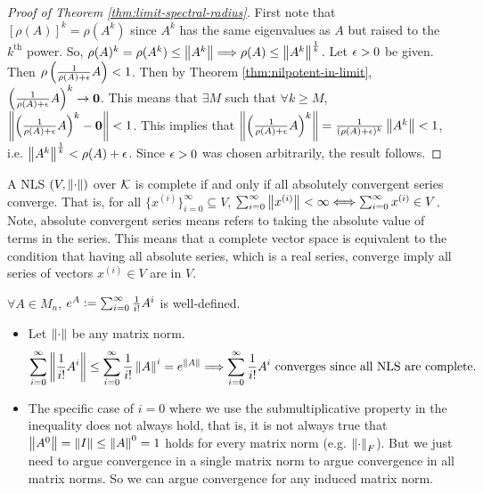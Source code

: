 \begin{proof}[Proof of Theorem \ref{thm:limit-spectral-radius}]
First note that $[\rho(A)]^k = \rho(A^k)$ since $A^k$ has the same eigenvalues as $A$ but raised to the $k^{\text{th}}$ power. So, $\rho(A)^k = \rho(A^k) \le \left\lVert A^k\right\rVert \Longrightarrow \rho(A)\le\left\lVert A^k\right\rVert^{\frac{1}{k}}$. Let $\epsilon>0$ be given. Then $\rho\left(\frac{1}{\rho(A)+\epsilon}A\right) < 1$. Then by Theorem \ref{thm:nilpotent-in-limit}, $\left(\frac{1}{\rho(A)+\epsilon}A\right)^k \rightarrow \mathbf{0}$. This means that $\exists M$ such that $\forall k \ge M$, $\left\lVert\left(\frac{1}{\rho(A)+\epsilon}A\right)^k - \mathbf{0}\right\rVert < 1$. This implies that $\left\lVert\left(\frac{1}{\rho(A)+\epsilon}A\right)^k\right\rVert = \frac{1}{(\rho(A)+\epsilon)^k}\left\lVert A^k\right\rVert < 1$, i.e. $\left\lVert A^k\right\rVert^{\frac1k} < \rho(A)+\epsilon$. Since $\epsilon > 0$ was chosen arbitrarily, the result follows.
\end{proof}

\begin{theorem}
\label{thm:complete-absolute-convergent}
A NLS $(V,\left\lVert\cdot\right\rVert)$ over $\mathcal{K}$ is complete if and only if all absolutely convergent series converge. That is, for all $\{x^{(i)}\}_{i=0}^\infty \subseteq V$, $\sum_{i=0}^\infty\left\lVert x^{(i)}\right\rVert < \infty \Longleftrightarrow \sum_{i=0}^{\infty} x^{(i)} \in V$. Note, absolute convergent series means refers to taking the absolute value of terms in the series. This means that a complete vector space is equivalent to the condition that having all absolute series, which is a real series, converge imply all series of vectors $x^{(i)} \in V$ are in $V$.
\end{theorem}
\begin{definition}
\label{def:matrix-exponential}
$\forall A \in M_n$, $e^A \vcentcolon= \sum_{i=0}^\infty \frac{1}{i!}A^i$ is well-defined.
\begin{itemize}
    \item Let $\left\lVert\cdot\right\rVert$ be any matrix norm.
    \[
        \sum_{i=0}^\infty \left\lVert\frac{1}{i!}A^i\right\rVert \le \sum_{i=0}^\infty \frac{1}{i!}\left\lVert A\right\rVert^i = e^{\left\lVert A\right\rVert} \Longrightarrow \sum_{i=0}^\infty \frac{1}{i!}A^i \text{ converges since all NLS are complete}.
    \]
    \item The specific case of $i=0$ where we use the submultiplicative property in the inequality does not always hold, that is, it is not always true that $\left\lVert A^0\right\rVert = \left\lVert I\right\rVert \le \left\lVert A\right\rVert^0 = 1$ holds for every matrix norm (e.g. $\left\lVert\cdot\right\rVert_F$). But we just need to argue convergence in a single matrix norm to argue convergence in all matrix norms. So we can argue convergence for any induced matrix norm.
\end{itemize}
\end{definition}

